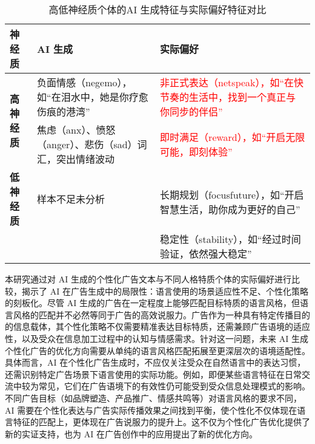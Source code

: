 \begin{table}[H]
\centering
\caption{\label{tab:study3-neuroticism_comparison} 高低神经质个体的AI 生成特征与实际偏好特征对比}
{\tablesongti
\renewcommand{\arraystretch}{1.5} %
\begin{tabularx}{\linewidth}{l X X} %
    \toprule
    \textbf{神经质} & \textbf{AI 生成} & \textbf{实际偏好} \\
    \midrule
    \multirow{2}{*}{\textbf{高神经质}} 
    & 负面情感（negemo），如“在泪水中，她是你疗愈伤痕的港湾” & \textcolor{red}{非正式表达（netspeak），如“在快节奏的生活中，找到一个真正与你同步的伴侣”} \\
    & 焦虑（anx）、愤怒（anger）、悲伤（sad）词汇，突出情绪波动 & \textcolor{red}{即时满足（reward），如“开启无限可能，即刻体验”} \\
    \midrule
    \multirow{2}{*}{\textbf{低神经质}} 
    &  \multirow{2}{*}{样本不足未分析} \\
    &  & 长期规划（focusfuture），如“开启智慧生活，助你成为更好的自己” \\
    &  & 稳定性（stability），如“经过时间验证，依然强大稳定” \\
    \bottomrule
\end{tabularx}
}
\end{table}


本研究通过对 AI 生成的个性化广告文本与不同人格特质个体的实际偏好进行比较，揭示了 AI 在广告生成中的局限性：语言使用的场景适应性不足、个性化策略的刻板化。尽管 AI 生成的广告在一定程度上能够匹配目标特质的语言风格，但语言风格的匹配并不必然等同于广告的高效说服力。广告作为一种具有特定传播目的的信息载体，其个性化策略不仅需要精准表达目标特质，还需兼顾广告语境的适应性，以及受众在信息加工过程中的认知与情感需求。针对这一问题，未来 AI 生成个性化广告的优化方向需要从单纯的语言风格匹配拓展至更深层次的语境适配性。具体而言，AI 在个性化广告生成时，不应仅关注受众在自然语言中的表达习惯，还需识别特定广告场景下语言使用的实际功能。例如，即便某些语言特征在日常交流中较为常见，它们在广告语境下的有效性仍可能受到受众信息处理模式的影响。不同广告目标（如品牌塑造、产品推广、情感共鸣等）对语言风格的要求不同，AI 需要在个性化表达与广告实际传播效果之间找到平衡，使个性化不仅体现在语言特征的匹配上，更体现在广告说服力的提升上。这不仅为个性化广告优化提供了新的实证支持，也为 AI 在广告创作中的应用提出了新的优化方向。